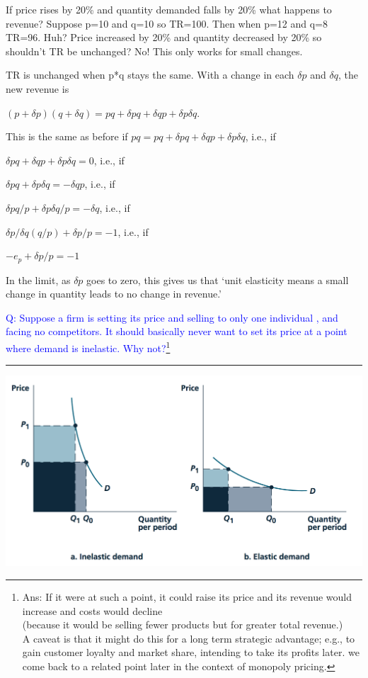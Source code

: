 \documentclass[]{article}
\begin{document}
If price rises by 20\% and quantity demanded falls by 20\% what happens
to revenue? Suppose p=10 and q=10 so TR=100. Then when p=12 and q=8
TR=96. Huh? Price increased by 20\% and quantity decreased by 20\% so
shouldn't TR be unchanged? No! This only works for small changes.

TR is unchanged when p*q stays the same. With a change in each
\(\delta p\) and \(\delta q\), the new revenue is

\((p+\delta p)(q+\delta q) = pq+\delta p q + \delta q p + \delta p \delta q\).

This is the same as before if
\(pq=pq+\delta p q + \delta q p + \delta p \delta q\), i.e., if

\(\delta p q + \delta q p + \delta p \delta q=0\), i.e., if

\(\delta p q + \delta p \delta q =-\delta q p\), i.e., if

\(\delta p q/p + \delta p \delta q/p =-\delta q\), i.e., if

\(\delta p/ \delta q (q/p) + \delta p /p =-1\), i.e., if

\(-e_p + \delta p /p = -1\)

In the limit, as \(\delta p\) goes to zero, this gives us that `unit
elasticity means a small change in quantity leads to no change in
revenue.'

\textcolor{blue}{Q: Suppose a firm is setting its price and selling to only one individual , and facing no  competitors. It should basically never want to set its price at a point where demand is inelastic. Why not?}\footnote{Ans:
  If it were at such a point, it could raise its price and its revenue
  would increase and costs would decline\\
  (because it would be selling fewer products but for greater total
  revenue.)\\
  A caveat is that it might do this for a long term strategic advantage;
  e.g., to gain customer loyalty and market share, intending to take its
  profits later. we come back to a related point later in the context of
  monopoly pricing.}

\begin{center}\rule{0.5\linewidth}{\linethickness}\end{center}

\includegraphics{picsfigs/elast_revenue.png}\\
\end{document}
